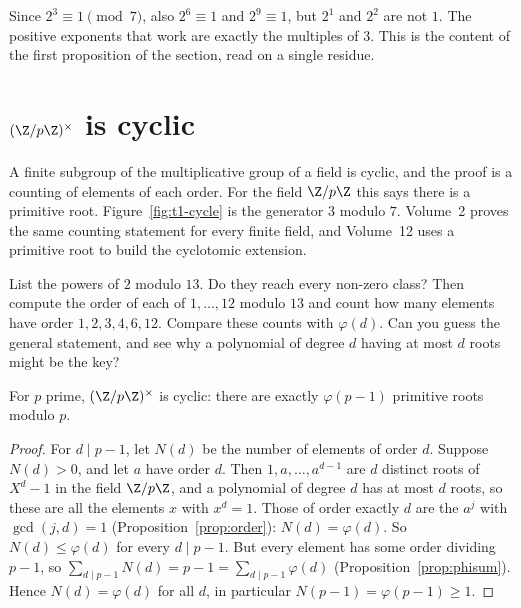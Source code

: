 \begin{examplex}
Since $2^3\equiv 1\pmod 7$, also $2^6\equiv 1$ and $2^9\equiv 1$, but $2^1$ and $2^2$ are not $1$. The positive exponents that work are exactly the multiples of $3$. This is the content of the first proposition of the section, read on a single residue.
\end{examplex}

\section{\texorpdfstring{$(\Z/p\Z)^\times$}{(Z/pZ)*} is cyclic}

A finite subgroup of the multiplicative group of a field is cyclic, and the proof is a counting of elements of each order. For the field $\Z/p\Z$ this says there is a primitive root. Figure~\ref{fig:t1-cycle} is the generator $3$ modulo $7$. Volume~2 proves the same counting statement for every finite field, and Volume~12 uses a primitive root to build the cyclotomic extension.

\begin{think}
List the powers of $2$ modulo $13$. Do they reach every non-zero class? Then compute the order of each of $1,\dots,12$ modulo $13$ and count how many elements have order $1,2,3,4,6,12$. Compare these counts with $\varphi(d)$. Can you guess the general statement, and see why a polynomial of degree $d$ having at most $d$ roots might be the key?
\end{think}

\begin{theorem}[Gauss]\label{thm:cyclic}
For $p$ prime, $(\Z/p\Z)^\times$ is cyclic: there are exactly $\varphi(p-1)$ primitive roots modulo $p$.
\end{theorem}
\begin{proof}
For $d\mid p-1$, let $N(d)$ be the number of elements of order $d$. Suppose $N(d)>0$, and let $a$ have order $d$. Then $1,a,\dots,a^{d-1}$ are $d$ distinct roots of $X^d-1$ in the field $\Z/p\Z$, and a polynomial of degree $d$ has at most $d$ roots, so these are all the elements $x$ with $x^d=1$. Those of order exactly $d$ are the $a^j$ with $\gcd(j,d)=1$ (Proposition~\ref{prop:order}): $N(d)=\varphi(d)$.
So $N(d)\le\varphi(d)$ for every $d\mid p-1$. But every element has some order dividing $p-1$, so $\sum_{d\mid p-1}N(d)=p-1=\sum_{d\mid p-1}\varphi(d)$ (Proposition~\ref{prop:phisum}). Hence $N(d)=\varphi(d)$ for all $d$, in particular $N(p-1)=\varphi(p-1)\ge1$.
\end{proof}

